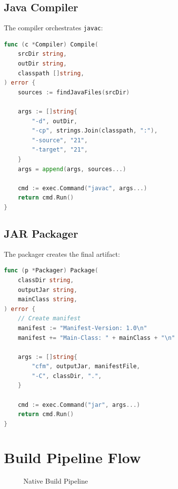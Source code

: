 \documentclass[12pt,a4paper]{report}
\begin{document}
\subsection{Java Compiler}

The compiler orchestrates \texttt{javac}:

\begin{lstlisting}[language=Go, caption=Compilation]
func (c *Compiler) Compile(
    srcDir string, 
    outDir string, 
    classpath []string,
) error {
    sources := findJavaFiles(srcDir)
    
    args := []string{
        "-d", outDir,
        "-cp", strings.Join(classpath, ":"),
        "-source", "21",
        "-target", "21",
    }
    args = append(args, sources...)
    
    cmd := exec.Command("javac", args...)
    return cmd.Run()
}
\end{lstlisting}

\subsection{JAR Packager}

The packager creates the final artifact:

\begin{lstlisting}[language=Go, caption=JAR Packaging]
func (p *Packager) Package(
    classDir string,
    outputJar string,
    mainClass string,
) error {
    // Create manifest
    manifest := "Manifest-Version: 1.0\n"
    manifest += "Main-Class: " + mainClass + "\n"
    
    args := []string{
        "cfm", outputJar, manifestFile,
        "-C", classDir, ".",
    }
    
    cmd := exec.Command("jar", args...)
    return cmd.Run()
}
\end{lstlisting}

\section{Build Pipeline Flow}

\begin{figure}[H]
\centering
{}
\caption{Native Build Pipeline}
\end{figure}
\end{document}
